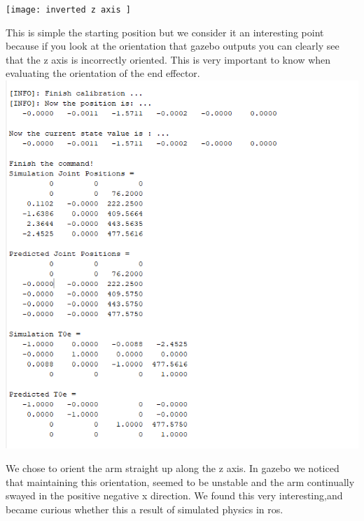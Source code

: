 \documentclass[12pt]{article}
\begin{document}
\texttt{[image: inverted z axis ]}
\par{
This is simple the starting position but we consider it an interesting point because if you look at the orientation that gazebo outputs you can clearly see that the z axis is incorrectly oriented. This is very important to know when evaluating the orientation of the end effector.
}
\includegraphics[scale=1]{straight up}
\par{
We chose to orient the arm straight up along the z axis. In gazebo we noticed that maintaining this orientation, seemed to be unstable and the arm continually swayed in the positive negative x direction. We found this very interesting,and became curious whether this a result of simulated physics in ros.
}
\end{document}
